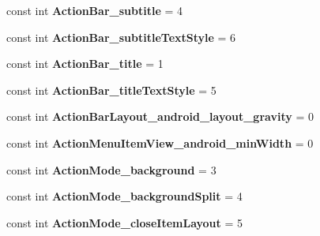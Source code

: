 \begin{DoxyCompactItemize}
const int {\bfseries Action\+Bar\+\_\+subtitle} = 4
\item 
\mbox{\label{class_sample_app_1_1_droid_1_1_resource_1_1_styleable_a08846376e7af9c935eb74471ae594ddd}} 
const int {\bfseries Action\+Bar\+\_\+subtitle\+Text\+Style} = 6
\item 
\mbox{\label{class_sample_app_1_1_droid_1_1_resource_1_1_styleable_ab50011c2dacb30a30114efd2329fd5bd}} 
const int {\bfseries Action\+Bar\+\_\+title} = 1
\item 
\mbox{\label{class_sample_app_1_1_droid_1_1_resource_1_1_styleable_a4b5f88485752671a91d0180a9f9aac77}} 
const int {\bfseries Action\+Bar\+\_\+title\+Text\+Style} = 5
\item 
\mbox{\label{class_sample_app_1_1_droid_1_1_resource_1_1_styleable_a3b9d6e6b3e73631ad728f383e7359141}} 
const int {\bfseries Action\+Bar\+Layout\+\_\+android\+\_\+layout\+\_\+gravity} = 0
\item 
\mbox{\label{class_sample_app_1_1_droid_1_1_resource_1_1_styleable_a2581fe1dfdb0ff47db21355e82aa0cc0}} 
const int {\bfseries Action\+Menu\+Item\+View\+\_\+android\+\_\+min\+Width} = 0
\item 
\mbox{\label{class_sample_app_1_1_droid_1_1_resource_1_1_styleable_a1fab14c4ea65f5d4b34d6e916762df15}} 
const int {\bfseries Action\+Mode\+\_\+background} = 3
\item 
\mbox{\label{class_sample_app_1_1_droid_1_1_resource_1_1_styleable_aa9ccdbd1375e5133ac983d51c86a74d6}} 
const int {\bfseries Action\+Mode\+\_\+background\+Split} = 4
\item 
\mbox{\label{class_sample_app_1_1_droid_1_1_resource_1_1_styleable_af26fbfcd3a9616410cd6aad201050505}} 
const int {\bfseries Action\+Mode\+\_\+close\+Item\+Layout} = 5
\item 

\end{DoxyCompactItemize}
